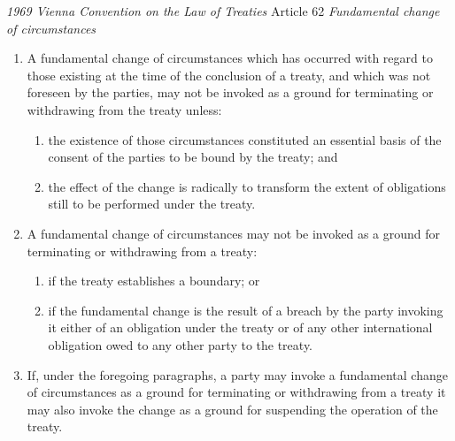 \begin{conventiondetails}{\textit{1969 Vienna Convention on the Law of Treaties} Article 62}\label{VCLT Art 62}
    \flushleft
    \textit{Fundamental change of circumstances}

    \begin{enumerate}
        \item A fundamental change of circumstances which has occurred with regard to those existing at the 
        time of the conclusion of a treaty, and which was not foreseen by the parties, may not be invoked as a ground for terminating or withdrawing from the treaty unless:
        \begin{enumerate}[label=(\alph*)]
            \item the existence of those circumstances constituted an essential basis of the consent of the parties to be bound by the treaty; and
            \item the effect of the change is radically to transform the extent of obligations still to be performed under the treaty.
        \end{enumerate}
        \item A fundamental change of circumstances may not be invoked as a ground for terminating or 
        withdrawing from a treaty:
        \begin{enumerate}[label=(\alph*)]
            \item if the treaty establishes a boundary; or 
            \item if the fundamental change is the result of a breach by the party invoking it either of an obligation under the treaty or of any other international obligation owed to any other party to the treaty.
        \end{enumerate}
        \item If, under the foregoing paragraphs, a party may invoke a fundamental change of circumstances as a ground for terminating or withdrawing from a treaty it may also invoke the change as a ground for suspending the operation of the treaty.
    \end{enumerate}
\end{conventiondetails}

